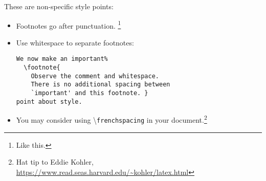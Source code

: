 These are non-specific style points:

\begin{itemize}
	\item Footnotes go after punctuation.%
			\footnote{Like this.}
	\item Use whitespace to separate footnotes:
\begin{lstlisting}[style=latexstyle]
We now make an important%
  \footnote{
	Observe the comment and whitespace.
	There is no additional spacing between
	`important' and this footnote. }
point about style.
\end{lstlisting}
	\item You may consider using \textbackslash\texttt{frenchspacing} in your document.\footnote{Hat tip to Eddie Kohler, \url{https://www.read.seas.harvard.edu/~kohler/latex.html}}
\end{itemize}